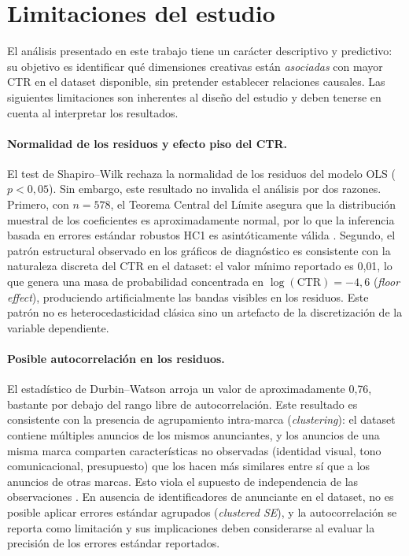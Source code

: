 \documentclass[12pt, a4paper]{report}
\begin{document}
\section{Limitaciones del estudio}

El análisis presentado en este trabajo tiene un carácter descriptivo y predictivo:
su objetivo es identificar qué dimensiones creativas están \textit{asociadas} con
mayor CTR en el dataset disponible, sin pretender establecer relaciones causales.
Las siguientes limitaciones son inherentes al diseño del estudio y deben tenerse
en cuenta al interpretar los resultados.

\paragraph{Normalidad de los residuos y efecto piso del CTR.}
El test de Shapiro--Wilk rechaza la normalidad de los residuos del modelo OLS
($p < 0{,}05$). Sin embargo, este resultado no invalida el análisis por dos razones.
Primero, con $n = 578$, el Teorema Central del Límite asegura que la distribución
muestral de los coeficientes es aproximadamente normal, por lo que la inferencia
basada en errores estándar robustos HC1 \citep{white1980} es asintóticamente válida
\citep[Cap.~5]{fox2016}. Segundo, el patrón estructural observado en los gráficos
de diagnóstico es consistente con la naturaleza discreta del CTR en el dataset:
el valor mínimo reportado es 0{,}01, lo que genera una masa de probabilidad
concentrada en $\log(\text{CTR}) = -4{,}6$ (\textit{floor effect}), produciendo
artificialmente las bandas visibles en los residuos. Este patrón no es heterocedasticidad
clásica sino un artefacto de la discretización de la variable dependiente.

\paragraph{Posible autocorrelación en los residuos.}
El estadístico de Durbin--Watson arroja un valor de aproximadamente 0{,}76, bastante
por debajo del rango libre de autocorrelación. Este resultado es consistente con la
presencia de agrupamiento intra-marca (\textit{clustering}): el dataset contiene
múltiples anuncios de los mismos anunciantes, y los anuncios de una misma marca
comparten características no observadas (identidad visual, tono comunicacional,
presupuesto) que los hacen más similares entre sí que a los anuncios de otras marcas.
Esto viola el supuesto de independencia de las observaciones \citep{breiman2001b}.
En ausencia de identificadores de anunciante en el dataset, no es posible aplicar
errores estándar agrupados (\textit{clustered SE}), y la autocorrelación se reporta
como limitación y sus implicaciones deben considerarse al evaluar la precisión de
los errores estándar reportados.
\end{document}
